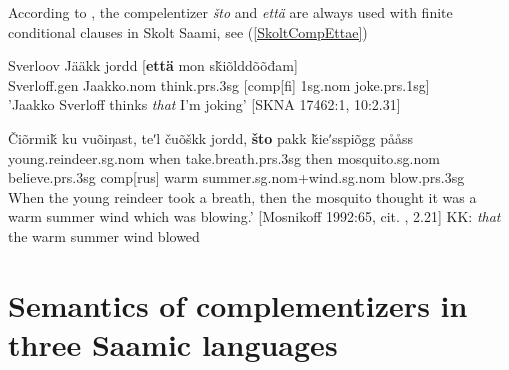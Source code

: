 \documentclass[a4,12pt]{scrartcl}
\begin{document}


According to \cite[332; 335]{feist2010}, the compelentizer {\it što} and {\it että} are always used with finite conditional clauses in Skolt Saami, see (\ref{SkoltCompEttae})

\begin{exe}
	\ex \label{SkoltCompThinkEttae} \cite[335]{feist2010}
	\gll Sverloov Jääkk jordd [{\bf että} mon sǩiõlddõõđam]\\
	Sverloff.{\sc gen} Jaakko.{\sc nom} think.{\sc prs.3sg} [{\sc comp[fi]} {\sc 1sg.nom} joke.{\sc prs.1sg}]\\
	'Jaakko Sverloff thinks {\it that} I'm joking' [SKNA 17462:1, 10:2.31]
	
	\ex \label{SkoltCompThinkSto}
	\gll Čiõrmiǩ ku vuõiŋast, teʹl čuõškk jordd, {\bf što} pakk ǩieʹsspiõgg pååss\\
	young.reindeer.{\sc sg.nom} when take.breath.{\sc prs.3sg} then mosquito.{\sc sg.nom} believe.{\sc prs.3sg} {\sc comp[rus]} warm summer.{\sc sg.nom}+wind.{\sc sg.nom} blow.{\sc prs.3sg}\\
When the young reindeer took a breath, then the mosquito thought it was a warm summer wind which was blowing.' [Mosnikoff 1992:65, cit. \cite[380]{feist2010}, 2.21] KK: {\it that} the warm summer wind blowed
\end{exe}


\section{Semantics of complementizers in three Saamic languages}\label{semantics}%
%
\end{document}
